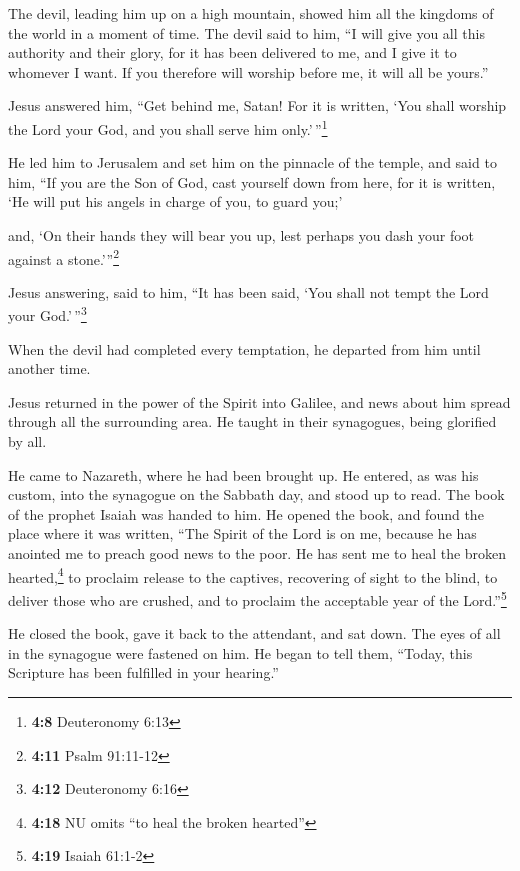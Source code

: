  The devil, leading him up on a high mountain, showed him
all the kingdoms of the world in a moment of time.  The
devil said to him, ``I will give you all this authority and their glory,
for it has been delivered to me, and I give it to whomever I want.
 If you therefore will worship before me, it will all be
yours.''

 Jesus answered him, ``Get behind me, Satan! For it is
written, `You shall worship the Lord your God, and you shall serve him
only.'\,''\footnote{\textbf{4:8} Deuteronomy 6:13}

 He led him to Jerusalem and set him on the pinnacle of
the temple, and said to him, ``If you are the Son of God, cast yourself
down from here,  for it is written, `He will put his
angels in charge of you, to guard you;'

 and, `On their hands they will bear you up, lest perhaps
you dash your foot against a stone.'''\footnote{\textbf{4:11} Psalm
  91:11-12}

 Jesus answering, said to him, ``It has been said, `You
shall not tempt the Lord your God.'\,''\footnote{\textbf{4:12}
  Deuteronomy 6:16}

 When the devil had completed every temptation, he
departed from him until another time.

 Jesus returned in the power of the Spirit into Galilee,
and news about him spread through all the surrounding area.
 He taught in their synagogues, being glorified by all.

 He came to Nazareth, where he had been brought up. He
entered, as was his custom, into the synagogue on the Sabbath day, and
stood up to read.  The book of the prophet Isaiah was
handed to him. He opened the book, and found the place where it was
written,  ``The Spirit of the Lord is on me, because he
has anointed me to preach good news to the poor. He has sent me to heal
the broken hearted,\footnote{\textbf{4:18} NU omits ``to heal the broken
  hearted''} to proclaim release to the captives, recovering of sight to
the blind, to deliver those who are crushed,  and to
proclaim the acceptable year of the Lord.''\footnote{\textbf{4:19}
  Isaiah 61:1-2}

 He closed the book, gave it back to the attendant, and
sat down. The eyes of all in the synagogue were fastened on him.
 He began to tell them, ``Today, this Scripture has been
fulfilled in your hearing.''

